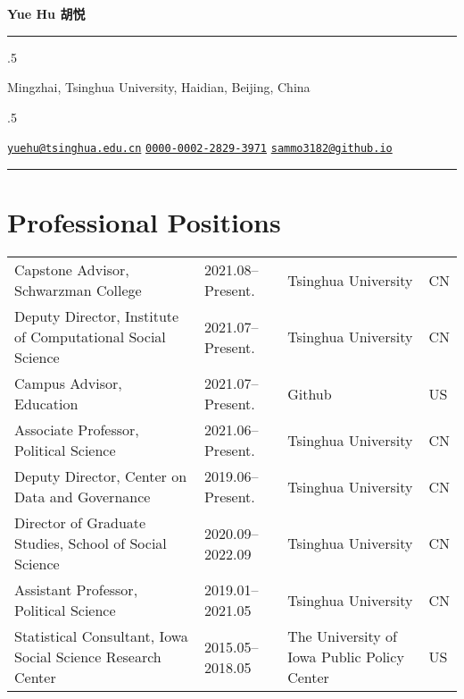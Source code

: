 \documentclass[
  12pt,
]
{article}
\begin{document}
\centerline{\huge \bf Yue Hu \textbar{} 胡悦}

\vspace{2 mm}

\hrule

\vspace{2 mm}


\moveleft.5\hoffset\centerline{Mingzhai, Tsinghua University, Haidian,
Beijing, China}
\moveleft.5\hoffset\centerline{ \faEnvelopeO \hspace{1 mm} \href{mailto:}{\tt yuehu@tsinghua.edu.cn} \hspace{1 mm}       \hspace{.5 mm} \href{https://orcid.org/0000-0002-2829-3971}{\tt 0000-0002-2829-3971} \hspace{1 mm}  \faGlobe \hspace{1 mm} \href{http://sammo3182@github.io}{\tt sammo3182@github.io}   }



\vspace{2 mm}

\hrule



\hypertarget{professional-positions}{%
\section{Professional Positions}\label{professional-positions}}

\begin{table}[!h]
\centering
\begin{tabular}{>{\raggedright\arraybackslash}p{20em}l>{\raggedright\arraybackslash}p{15em}l}

Capstone Advisor, Schwarzman College & 2021.08--Present. & Tsinghua University & CN\\
Deputy Director, Institute of Computational Social Science & 2021.07--Present. & Tsinghua University & CN\\
Campus Advisor, Education & 2021.07--Present. & Github & US\\
Associate Professor, Political Science & 2021.06--Present. & Tsinghua University & CN\\
Deputy Director, Center on Data and Governance & 2019.06--Present. & Tsinghua University & CN\\
\addlinespace
Director of Graduate Studies, School of Social Science & 2020.09--2022.09 & Tsinghua University & CN\\
Assistant Professor, Political Science & 2019.01--2021.05 & Tsinghua University & CN\\
Statistical Consultant, Iowa Social Science Research Center & 2015.05--2018.05 & The University of Iowa Public Policy Center & US\\

\end{tabular}
\end{table}
\end{document}
